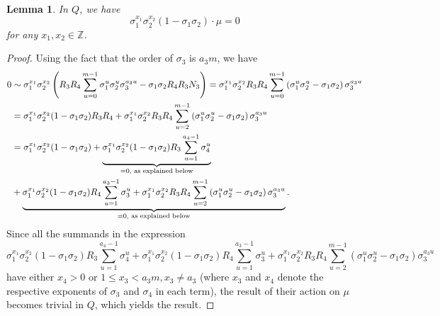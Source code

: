 \documentclass[12pt,a4paper]{article}
\newtheorem{lemma}[theorem]{Lemma}
\theoremstyle{definition}
\newcommand{\Z}{\mathbb{Z}}
\begin{document}
\paragraph*{}
\begin{lemma}\label{diag}
In $Q$, we have $$\sigma_1^{x_1}\sigma_2^{x_2}(1-\sigma_1\sigma_2)\cdot \mu=0$$
for any $x_1,x_2\in\Z$.
\end{lemma}
\begin{proof}
Using the fact that the order of $\sigma_3$ is $a_3m$, we have
\begin{align*}
0&\sim \sigma_1^{x_1}\sigma_2^{x_2}\left(R_3R_4\sum_{u=0}^{m-1}\sigma_1^{u}\sigma_2^{u}\sigma_3^{a_3u}-\sigma_1\sigma_2R_4R_3N_3\right)=\sigma_1^{x_1}\sigma_2^{x_2}R_3R_4\sum_{u=0}^{m-1}\left(\sigma_1^{u}\sigma_2^{u}-\sigma_1\sigma_2\right)\sigma_3^{a_3u}\\
&=\sigma_1^{x_1}\sigma_2^{x_2}(1-\sigma_1\sigma_2)R_3R_4+\sigma_1^{x_1}\sigma_2^{x_2}R_3R_4\sum_{u=2}^{m-1}\left(\sigma_1^{u}\sigma_2^{u}-\sigma_1\sigma_2\right)\sigma_3^{a_3u}\\
&=\sigma_1^{x_1}\sigma_2^{x_2}(1-\sigma_1\sigma_2)+\underbrace{\sigma_1^{x_1}\sigma_2^{x_2}(1-\sigma_1\sigma_2)R_3\sum_{u=1}^{a_4-1}\sigma_4^u}_{
=0, \text{ as explained below}
}\\
&+\underbrace{\sigma_1^{x_1}\sigma_2^{x_2}(1-\sigma_1\sigma_2)R_4\sum_{u=1}^{a_3-1}\sigma_3^u+\sigma_1^{x_1}\sigma_2^{x_2}R_3R_4\sum_{u=2}^{m-1}\left(\sigma_1^{u}\sigma_2^{u}-\sigma_1\sigma_2\right)\sigma_3^{a_3u}}_{
=0, \text{ as explained below}
}.
\end{align*}
Since all the summands in the expression $$\sigma_1^{x_1}\sigma_2^{x_2}(1-\sigma_1\sigma_2)R_3\sum_{u=1}^{a_4-1}\sigma_4^u
+\sigma_1^{x_1}\sigma_2^{x_2}(1-\sigma_1\sigma_2)R_4\sum_{u=1}^{a_3-1}\sigma_3^u+\sigma_1^{x_1}\sigma_2^{x_2}R_3R_4\sum_{u=2}^{m-1}\left(\sigma_1^{u}\sigma_2^{u}-\sigma_1\sigma_2\right)\sigma_3^{a_3u}$$
have either $x_4>0$ or $ 1\leq x_3<a_3m,  x_3\neq a_3$ (where $x_3$ and $x_4$ denote the respective exponents of $\sigma_3$ and $\sigma_4$ in each term), the result of their action on $\mu$ becomes trivial in $Q$, which yields the result.
\end{proof}

\end{document}
